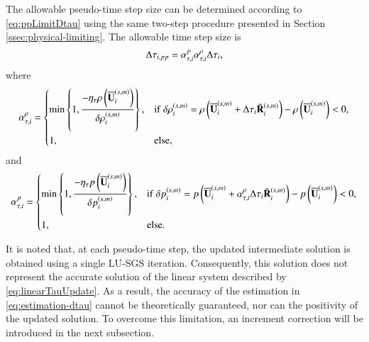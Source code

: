 The allowable pseudo-time step size can be determined according to \eqref{eq:ppLimitDtau}
using the same two-step procedure presented in Section \ref{ssec:physical-limiting}.
The allowable time step size is 
\begin{equation}
    \label{eq:alpha-tau}
    \mathrm\Delta \tau_{i,pp}= \alpha_{\tau,i}^{p}\alpha_{\tau,i}^{\rho} \mathrm\Delta  \tau_{i},
\end{equation}
where
\begin{equation}
    \label{eq:alpha-tau-rho}
    \alpha_{\tau,i}^{\rho} = \begin{dcases}
        \min\left\{1, \dfrac{-\eta_\tau \rho\left(\overline{\mathbf{U}}^{\left(s,m\right)}_i\right)}{\delta \rho_i^{\left(s,m\right)}} \right\}, & \mathrm{if} \ \delta \rho_i^{\left(s,m\right)}= \rho\left(\overline{\mathbf{U}}^{\left(s,m\right)}_i + \mathrm\Delta \tau_{i} \tilde{\mathbf{R}}^{\left(s,m\right)}_i\right) - \rho\left(\overline{\mathbf{U}}^{\left(s,m\right)}_i\right) < 0, \\
        1, & \mathrm{else},
    \end{dcases}
\end{equation}
and
\begin{equation}
    \label{eq:alpha-tau-p}
    \alpha_{\tau,i}^{p} = \begin{dcases}
        \min\left\{1, \dfrac{-\eta_\tau p \left(\overline{\mathbf{U}}^{\left(s,m\right)}_i\right)}{\delta p_i^{\left(s,m\right)}} \right\}, & \mathrm{if} \ \delta p_i^{\left(s,m\right)} = p \left(\overline{\mathbf{U}}^{\left(s,m\right)}_i + \alpha_{\tau,i}^{\rho} \mathrm\Delta \tau_{i} \tilde{\mathbf{R}}^{\left(s,m\right)}_i\right) -p \left(\overline{\mathbf{U}}^{\left(s,m\right)}_i\right) < 0, \\
        1, &\mathrm{else}.
    \end{dcases}
\end{equation}

It is noted that, at each pseudo-time step, the updated intermediate solution is obtained using a single LU-SGS iteration. Consequently, this solution does not represent the accurate solution of the linear system described by \eqref{eq:linearTauUpdate}. As a result, the accuracy of the estimation in \eqref{eq:estimation-dtau} cannot be theoretically guaranteed, nor can the positivity of the updated solution. %
To overcome this limitation, an increment correction will be introduced in the next subsection.

